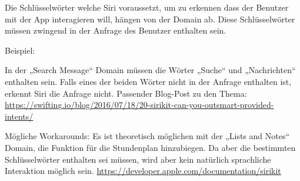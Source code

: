 \newpage

Die Schlüsselwörter welche Siri voraussetzt, um zu erkennen dass der Benutzer mit der App interagieren will, hängen von der Domain ab.
Diese Schlüsselwörter müssen zwingend in der Anfrage des Benutzer enthalten sein. 

Beispiel: 

In der „Search Message“  Domain müssen die Wörter „Suche“ und „Nachrichten“ enthalten sein. Falls eines der beiden Wörter nicht in der Anfrage enthalten ist, erkennt Siri die Anfrage nicht.  \newline
Passender Blog-Post zu den Thema: \newline
\url{https://swifting.io/blog/2016/07/18/20-sirikit-can-you-outsmart-provided-intents/}

Mögliche Workarounds: \newline
Es ist theoretisch möglichen mit der „Lists and Notes“ Domain, die Funktion für die Stundenplan hinzubiegen. Da aber die bestimmten Schlüsselwörter enthalten sei müssen, wird aber kein natürlich sprachliche Interaktion möglich sein.
\url{https://developer.apple.com/documentation/sirikit}